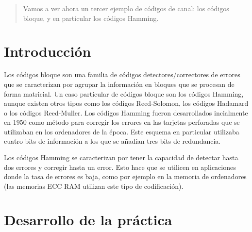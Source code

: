 \documentclass[es,practica,12pt]{uah}
\begin{document}

\maketitle

\begin{abstract}
	Vamos a ver ahora un tercer ejemplo de códigos de canal: los códigos bloque, y en particular los códigos Hamming.
\end{abstract}

\section{Introducción}

Los códigos bloque son una familia de códigos detectores/correctores de errores que se caracterizan por agrupar la información en bloques que se procesan de forma matricial. Un caso particular de códigos bloque son los códigos Hamming, aunque existen otros tipos como los códigos Reed-Solomon, los códigos Hadamard o los códigos Reed-Muller. Los códigos Hamming fueron desarrollados incialmente en 1950 como método para corregir los errores en las tarjetas perforadas que se utilizaban en los ordenadores de la época. Este esquema en particular utilizaba cuatro bits de información a los que se añadían tres bits de redundancia.

Los códigos Hamming se caracterizan por tener la capacidad de detectar hasta dos errores y corregir hasta un error. Esto hace que se utilicen en aplicaciones donde la tasa de errores es baja, como por ejemplo en la memoria de ordenadores (las memorias ECC RAM utilizan este tipo de codificación).


\section{Desarrollo de la práctica}
\end{document}
